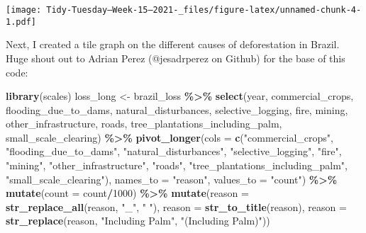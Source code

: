 \documentclass[
]{article}
\newenvironment{Shaded}{\begin{snugshade}}{\end{snugshade}}
\newcommand{\DataTypeTok}[1]{\textcolor[rgb]{0.13,0.29,0.53}{#1}}
\newcommand{\DecValTok}[1]{\textcolor[rgb]{0.00,0.00,0.81}{#1}}
\newcommand{\KeywordTok}[1]{\textcolor[rgb]{0.13,0.29,0.53}{\textbf{#1}}}
\newcommand{\NormalTok}[1]{#1}
\newcommand{\OperatorTok}[1]{\textcolor[rgb]{0.81,0.36,0.00}{\textbf{#1}}}
\newcommand{\StringTok}[1]{\textcolor[rgb]{0.31,0.60,0.02}{#1}}
\begin{document}
\texttt{[image: Tidy-Tuesday---Week-15--2021-\_files/figure-latex/unnamed-chunk-4-1.pdf]}

Next, I created a tile graph on the different causes of deforestation in
Brazil. Huge shout out to Adrian Perez (@jesadrperez on Github) for the
base of this code:

\begin{Shaded}
\begin{Highlighting}[]
\KeywordTok{library}\NormalTok{(scales)}
\NormalTok{loss\_long \textless{}{-}}\StringTok{ }\NormalTok{brazil\_loss }\OperatorTok{\%\textgreater{}\%}\StringTok{ }
\StringTok{  }\KeywordTok{select}\NormalTok{(year, commercial\_crops, flooding\_due\_to\_dams, natural\_disturbances, selective\_logging, }
\NormalTok{         fire, mining, other\_infrastructure, roads, tree\_plantations\_including\_palm, small\_scale\_clearing) }\OperatorTok{\%\textgreater{}\%}
\StringTok{  }\KeywordTok{pivot\_longer}\NormalTok{(}\DataTypeTok{cols =} \KeywordTok{c}\NormalTok{(}\StringTok{"commercial\_crops"}\NormalTok{, }\StringTok{"flooding\_due\_to\_dams"}\NormalTok{, }\StringTok{"natural\_disturbances"}\NormalTok{, }
                        \StringTok{"selective\_logging"}\NormalTok{, }\StringTok{"fire"}\NormalTok{, }\StringTok{"mining"}\NormalTok{, }\StringTok{"other\_infrastructure"}\NormalTok{, }\StringTok{"roads"}\NormalTok{, }
                        \StringTok{"tree\_plantations\_including\_palm"}\NormalTok{, }\StringTok{"small\_scale\_clearing"}\NormalTok{), }
               \DataTypeTok{names\_to =} \StringTok{"reason"}\NormalTok{, }
               \DataTypeTok{values\_to =} \StringTok{"count"}\NormalTok{) }\OperatorTok{\%\textgreater{}\%}
\StringTok{  }\KeywordTok{mutate}\NormalTok{(}\DataTypeTok{count =}\NormalTok{ count}\OperatorTok{/}\DecValTok{1000}\NormalTok{) }\OperatorTok{\%\textgreater{}\%}
\StringTok{  }\KeywordTok{mutate}\NormalTok{(}\DataTypeTok{reason =} \KeywordTok{str\_replace\_all}\NormalTok{(reason, }\StringTok{"\_"}\NormalTok{, }\StringTok{" "}\NormalTok{),}
    \DataTypeTok{reason =} \KeywordTok{str\_to\_title}\NormalTok{(reason),}
    \DataTypeTok{reason =} \KeywordTok{str\_replace}\NormalTok{(reason, }\StringTok{"Including Palm"}\NormalTok{, }\StringTok{"(Including Palm)"}\NormalTok{))}


\end{Highlighting}
\end{Shaded}
\end{document}

